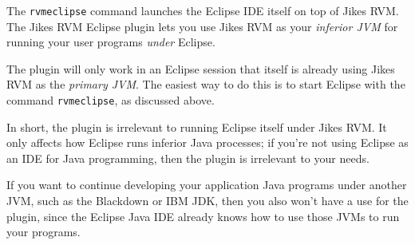 The {\tt rvmeclipse} command launches the Eclipse IDE itself on top of
Jikes RVM.  The Jikes RVM Eclipse plugin lets you use Jikes RVM as
your {\em inferior JVM} for running your user programs {\em under} Eclipse.

The plugin will only work in an Eclipse session that itself is already
using Jikes RVM as the {\em primary JVM}.  The easiest way to do this is to start Eclipse with the
command {\tt rvmeclipse}, as discussed above.

In short, the plugin is irrelevant to running Eclipse itself under
Jikes RVM.  It only affects how Eclipse runs inferior Java processes;
if you're not using Eclipse as an IDE for Java programming, then
the plugin is irrelevant to your needs.

If you want to continue developing your application Java programs
under another JVM, such as the Blackdown or IBM JDK, then you also
won't have a use for the plugin, since the Eclipse Java IDE already
knows how to use those JVMs to run your programs.
